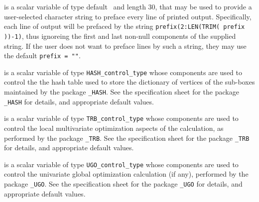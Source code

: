 \documentclass{galahad}
\begin{document}
\begin{description}
 is a scalar variable of type default \character\
and length 30, that may be used to provide a user-selected
character string to preface every line of printed output.
Specifically, each line of output will be prefaced by the string
{\tt prefix(2:LEN(TRIM( prefix ))-1)},
thus ignoreing the first and last non-null components of the
supplied string. If the user does not want to preface lines by such
a string, they may use the default {\tt prefix = ""}.

 is a scalar variable of type
{\tt HASH\_control\_type}
whose components are used to control the the hash table used to store
the dictionary of vertices of the sub-boxes maintained by the package
{\tt \libraryname\_HASH}.
See the specification sheet for the package
{\tt \libraryname\_HASH}
for details, and appropriate default values.

 is a scalar variable of type
{\tt TRB\_control\_type}
whose components are used to control the local multivariate
optimization aspects of the calculation, as performed by the package
{\tt \libraryname\_TRB}.
See the specification sheet for the package
{\tt \libraryname\_TRB}
for details, and appropriate default values.

 is a scalar variable of type
{\tt UGO\_control\_type}
whose components are used to control the
univariate global optimization calculation (if any),
performed by the package
{\tt \libraryname\_UGO}.
See the specification sheet for the package
{\tt \libraryname\_UGO}
for details, and appropriate default values.

\end{description}

\end{document}
